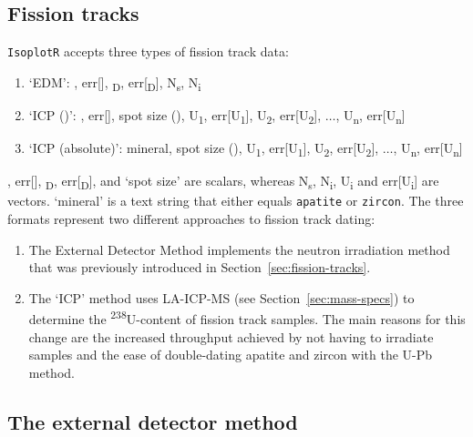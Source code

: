 \begin{refsection}

\chapter{Fission tracks}\label{ch:fissiontracks}

\texttt{IsoplotR} accepts three types of fission track data:

\begin{enumerate}
\item{`EDM':} \textzeta, err[\textzeta],
  \textrho\textsubscript{D}, err[\textrho\textsubscript{D}], 
  N\textsubscript{s}, N\textsubscript{i}
\item{`ICP (\textzeta)':} \textzeta, err[\textzeta], spot size
  (), U\textsubscript{1}, err[U\textsubscript{1}],
  U\textsubscript{2}, err[U\textsubscript{2}], $\ldots$,
  U\textsubscript{n}, err[U\textsubscript{n}]
\item{`ICP (absolute)':} mineral, spot size (),
  U\textsubscript{1}, err[U\textsubscript{1}], U\textsubscript{2},
  err[U\textsubscript{2}], $\ldots$, U\textsubscript{n},
  err[U\textsubscript{n}]
\end{enumerate}

\noindent \textzeta, err[\textzeta], \textrho\textsubscript{D},
err[\textrho\textsubscript{D}], and `spot size' are scalars, whereas
N\textsubscript{s}, N\textsubscript{i}, U\textsubscript{i} and
err[U\textsubscript{i}] are vectors. `mineral' is a text string that
either equals \texttt{apatite} or \texttt{zircon}.  The three formats
represent two different approaches to fission track dating:

\begin{enumerate}
\item The External Detector Method \citep[EDM,][]{hurford1983}
  implements the neutron irradiation method that was previously
  introduced in Section~\ref{sec:fission-tracks}.
\item The `ICP' method uses LA-ICP-MS (see
  Section~\ref{sec:mass-specs}) to determine the
  \textsuperscript{238}U-content of fission track samples.  The main
  reasons for this change are the increased throughput achieved by not
  having to irradiate samples and the ease of double-dating apatite
  and zircon with the U-Pb method.
\end{enumerate}

\section{The external detector method}
\label{sec:EDM}


\end{refsection}
